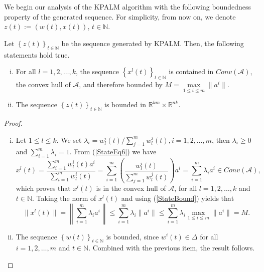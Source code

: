 We begin our analysis of the KPALM algorithm with the following boundedness property of the generated sequence. For simplicity, from now on, we denote $z(t):=\left( w(t),x(t) \right)$, $t \in \mathbb{N}$.
\begin{proposition} \label{boundedness_prop}
Let $\left\lbrace z(t) \right\rbrace_{t \in \mathbb{N}}$ be the sequence generated by KPALM. Then, the following statements hold true.
\begin{enumerate}[(i)]
	\item For all $l=1, 2, \ldots ,k$, the sequence $\left\lbrace x^l(t) \right\rbrace_{t \in \mathbb{N}}$ is contained in $Conv(\mathcal{A})$, the convex hull of $\mathcal{A}$, and therefore bounded by $M = \max\limits_{1 \leq i \leq m} \| a^i \|$. \label{boundedness_prop_1}
	\item The sequence $\left\lbrace z(t) \right\rbrace_{t \in \mathbb{N}}$ is bounded in $\mathbb{R}^{km} \times \mathbb{R}^{nk}$. \label{boundedness_prop_2}
\end{enumerate}
\end{proposition}

\begin{proof}
\begin{enumerate}[(i)]
	\item  Let $1\leq l \leq k$. We set $\lambda_i = w^i_l(t)/\sum\limits_{j=1}^{m} w^j_l(t), i=1, 2, \ldots ,m$, then $\lambda_i \geq 0$ and $\sum\limits_{i=1}^{m} \lambda_i = 1$. From (\ref{StateEq6}) we have
	\begin{equation}
		x^l(t) = \frac{\sum_{i=1}^{m} w^i_l(t) a^i}{\sum_{i=1}^{m} w^i_l(t)} 
		= \sum_{i=1}^{m} \left( \frac{ w^i_l(t)}{\sum_{j=1}^{m} w^j_l(t)} \right) a^i 
		= \sum\limits_{i=1}^{m} \lambda_i a^i \in Conv(\mathcal{A}), \label{StateBound}
	\end{equation}
	which proves that $x^l(t)$ is in the convex hull of $\mathcal{A}$, for all $l = 1, 2, \ldots, k$ and $t \in \mathbb{N}$. Taking the norm of $x^l(t)$ and using (\ref{StateBound}) yields that
	\begin{equation*}
		\| x^l(t) \| = \left\lVert \sum_{i=1}^{m} \lambda_i a^i \right\lVert
		\leq \sum_{i=1}^{m} \lambda_i \| a^i \|
		\leq \sum_{i=1}^{m} \lambda_i \max\limits_{1 \leq i \leq m} \| a^i \| = M .
	\end{equation*}
	\item The sequence $\left\lbrace w(t) \right\rbrace_{t \in \mathbb{N}}$ is bounded, since $w^i(t) \in \Delta$ for all $i=1, 2, \ldots ,m$ and $t \in \mathbb{N}$. Combined with the previous item, the result follows.
\end{enumerate} 
\end{proof}

